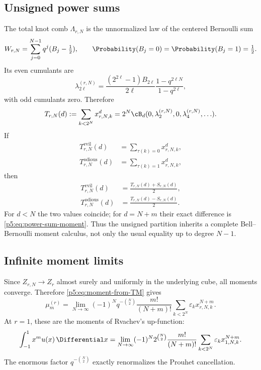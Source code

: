 \documentclass[11pt]{article}
\theoremstyle{definition}
\theoremstyle{remark}
\newcommand{\eps}{\varepsilon}
\begin{document}
\subsection{Unsigned power sums}

The total knot comb $\Lambda_{r,N}$ is the unnormalized law of the centered
Bernoulli sum
\begin{equation}
 W_{r,N}=\sum_{j=0}^{N-1}q^j(B_j-\tfrac12),
 \qquad \Probability(B_j=0)=\Probability(B_j=1)=\tfrac12.                \label{p5:eq:W-rN}
\end{equation}
Its even cumulants are
\begin{equation}
 \lambda_{2\ell}^{(r,N)}
 =\frac{(2^{2\ell}-1)B_{2\ell}}{2\ell}
   \frac{1-q^{2\ell N}}{1-q^{2\ell}},                    \label{p5:eq:Bernoulli-knot-cumulants}
\end{equation}
with odd cumulants zero.  Therefore
\begin{equation}
 T_{r,N}(d):=\sum_{k<2^N}x_{r,N,k}^d
 =2^N\cB_d(0,\lambda_2^{(r,N)},0,\lambda_4^{(r,N)},\ldots). \label{p5:eq:total-knot-power}
\end{equation}
If
\begin{align}
 T_{r,N}^{\mathrm{evil}}(d)&=\sum_{\tau(k)=0}x_{r,N,k}^d, \\
 T_{r,N}^{\mathrm{odious}}(d)&=\sum_{\tau(k)=1}x_{r,N,k}^d,
\end{align}
then
\begin{align}
 T_{r,N}^{\mathrm{evil}}(d)
 &=\frac{T_{r,N}(d)+S_{r,N}(d)}2,                          \label{p5:eq:evil-power}\\
 T_{r,N}^{\mathrm{odious}}(d)
 &=\frac{T_{r,N}(d)-S_{r,N}(d)}2.                          \label{p5:eq:odious-power}
\end{align}
For $d<N$ the two values coincide; for $d=N+m$ their exact difference is
\eqref{p5:eq:power-sum-moment}.  Thus the unsigned partition inherits a complete
Bell--Bernoulli moment calculus, not only the usual equality up to degree
$N-1$.

\subsection{Infinite moment limits}

Since $Z_{r,N}\to Z_r$ almost surely and uniformly in the underlying cube,
all moments converge.  Therefore \eqref{p5:eq:moment-from-TM} gives
\begin{equation}
 \boxed{\displaystyle
 \mu_m^{(r)}
 =\lim_{N\to\infty}(-1)^Nq^{-\binom N2}\frac{m!}{(N+m)!}
 \sum_{k<2^N}\eps_kx_{r,N,k}^{N+m}.}                     \label{p5:eq:sparse-moment-TM-limit}
\end{equation}
At $r=1$, these are the moments of Rvachev's up-function:
\begin{equation}
 \int_{-1}^{1}x^m u(x)\,\Differential x
 =\lim_{N\to\infty}(-1)^N2^{\binom N2}\frac{m!}{(N+m)!}
 \sum_{k<2^N}\eps_kx_{1,N,k}^{N+m}.                      \label{p5:eq:up-moment-TM-limit}
\end{equation}
The enormous factor $q^{-\binom N2}$ exactly renormalizes the Prouhet
cancellation.
\end{document}
